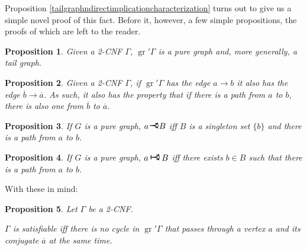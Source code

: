 \documentclass[11pt]{article}
\newcommand{\conj}[1]{\overline{#1}}
\DeclareMathOperator{\gr}{gr}
\newcommand{\rightcurveor}{
\!
\mathrel{
  \begin{tikzpicture}[scale=0.8]
    \draw[thick,->] (0,0) arc (90:150:-2ex);
    \draw[thick,->] (0,0) arc (90:30:2ex);
    \draw[thick] (-1ex, 0) -- (0.1ex,0);
  \end{tikzpicture}
}\!
}
\newcommand{\Rightcurveor}{
\mathrel{
  \begin{tikzpicture}[scale=0.8]
    \draw[thick,->] (0,0) arc (90:150:-2ex);
    \draw[thick,->] (0,0) arc (90:30:2ex);
    \draw[thick] (-1ex, 0) -- (0.1ex,0);
    \draw[thick] (-1ex, -0.7ex) -- (-1ex, 0.7ex);
  \end{tikzpicture}
}
}
\newtheorem{prop}{Proposition}
\begin{document}
Proposition \ref{tailgraphndirectimplicationcharacterization} turns out to give us a simple novel proof of this fact. Before it, however, a few simple propositions, the proofs of which are left to the reader.

\begin{prop}
Given a 2-CNF $\Gamma$, $\gr' \Gamma$ is a pure graph and, more generally, a tail graph.
\end{prop}

\begin{prop}
Given a 2-CNF $\Gamma$, if $\gr' \Gamma$ has the edge $a \rightarrow b$ it also has the edge $\conj b \rightarrow \conj a$. As such, it also has the property that if there is a path from $a$ to $b$, there is also one from $\conj b$ to $\conj a$.
\end{prop}

\begin{prop}
If $G$ is a pure graph, $a \rightcurveor B$ iff $B$ is a singleton set $\{b\}$ and there is a path from $a$ to $b$.
\end{prop}

\begin{prop}
If $G$ is a pure graph, $a \Rightcurveor B$ iff there exists $b \in B$ such that there is a path from $a$ to $b$.
\end{prop}

With these in mind:

\begin{prop}
Let $\Gamma$ be a 2-CNF.

$\Gamma$ is satisfiable iff there is no cycle in $\gr' \Gamma$ that passes through a vertex $a$ and its conjugate $\conj a$ at the same time.
\end{prop}
\end{document}
